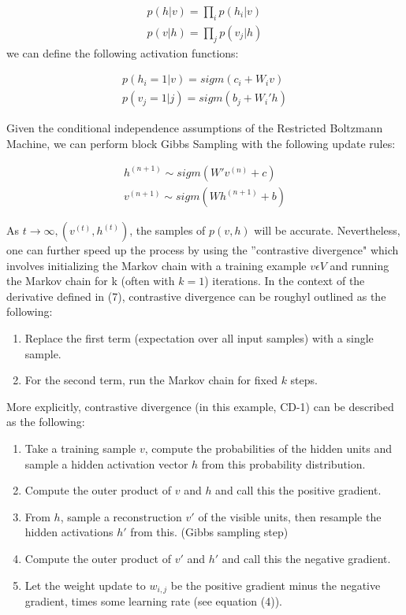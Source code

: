 \documentclass[journal]{IEEEtran}
\begin{document}
\begin{equation}
\begin{aligned}
p(h|v) = \prod\limits_{i} p(h_{i}|v)\\
p(v|h) = \prod\limits_{j} p(v_{j}|h)
\end{aligned}
\end{equation} we can define the following activation functions:

\begin{equation}
\begin{aligned}
p(h_{i} = 1|v) = sigm(c_{i} + W_{i}v)\\
p(v_{j} = 1|j) = sigm(b_{j} + W_{i}'h)
\end{aligned}
\end{equation}

Given the conditional independence assumptions of the Restricted Boltzmann Machine, we can perform block Gibbs Sampling with the following update rules:

\begin{equation}
\begin{aligned}
h^{(n+1)} \sim sigm(W'v^{(n)} + c)\\
v^{(n+1)} \sim sigm(Wh^{(n+1)} + b)
\end{aligned}
\end{equation}

As $t \rightarrow \infty,  (v^{(t)},h^{(t)})$, the samples of $p(v,h)$ will be accurate.  Nevertheless, one can further speed up the process by using the ''contrastive divergence" which involves initializing the Markov chain with a training example $v \epsilon V$ and running the Markov chain for k (often with $k = 1$) iterations.  In the context of the derivative defined in (7), contrastive divergence can be roughyl outlined as the following:

\begin{enumerate}
 \item Replace the first term (expectation over all input samples) with a single sample.
 \item For the second term, run the Markov chain for fixed $k$ steps.
\end{enumerate}

More explicitly, contrastive divergence (in this example, CD-1) can be described as the following:

\begin{enumerate}
\item Take a training sample $v$, compute the probabilities of the hidden units and sample a hidden activation vector $h$ from this probability distribution.
\item Compute the outer product of $v$ and $h$ and call this the positive gradient.
\item From $h$, sample a reconstruction $v'$ of the visible units, then resample the hidden activations $h'$ from this. (Gibbs sampling step)
\item Compute the outer product of $v'$ and $h'$ and call this the negative gradient.
\item Let the weight update to $w_{i,j}$ be the positive gradient minus the negative gradient, times some learning rate (see equation (4)). 
\end{enumerate}
\end{document}
